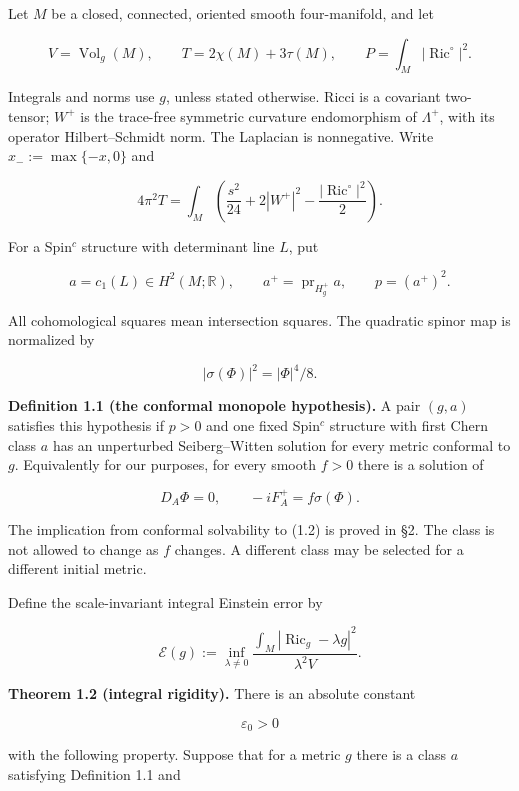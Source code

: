 \documentclass[
  11pt,
]{article}
\begin{document}
Let \(M\) be a closed, connected, oriented smooth four-manifold, and let

\[
 V=\operatorname{Vol}_g(M),\qquad T=2\chi(M)+3\tau(M),\qquad
 P=\int_M|\operatorname{Ric}^{\circ}|^2.
\]

Integrals and norms use \(g\), unless stated otherwise. Ricci is a
covariant two-tensor; \(W^+\) is the trace-free symmetric curvature
endomorphism of \(\Lambda^+\), with its operator Hilbert--Schmidt norm.
The Laplacian is nonnegative. Write \(x_-:=\max\{-x,0\}\) and

\[
 4\pi^2T=\int_M\left(\frac{s^2}{24}+2|W^+|^2
                          -\frac{|\operatorname{Ric}^{\circ}|^2}{2}\right).
 \tag{1.1}
\]

For a Spin\(^c\) structure with determinant line \(L\), put

\[
 a=c_1(L)\in H^2(M;\mathbb R),\qquad
 a^+=\operatorname{pr}_{H_g^+}a,\qquad p=(a^+)^2.
\]

All cohomological squares mean intersection squares. The quadratic
spinor map is normalized by

\[
 |\sigma(\Phi)|^2=|\Phi|^4/8.
\]

\textbf{Definition 1.1 (the conformal monopole hypothesis).} A pair
\((g,a)\) satisfies this hypothesis if \(p>0\) and one fixed Spin\(^c\)
structure with first Chern class \(a\) has an unperturbed
Seiberg--Witten solution for every metric conformal to \(g\).
Equivalently for our purposes, for every smooth \(f>0\) there is a
solution of

\[
 D_A\Phi=0,\qquad -iF_A^+=f\sigma(\Phi).                 \tag{1.2}
\]

The implication from conformal solvability to (1.2) is proved in §2. The
class is not allowed to change as \(f\) changes. A different class may
be selected for a different initial metric.

Define the scale-invariant integral Einstein error by

\[
 \mathcal E(g):=\inf_{\lambda\ne0}
  \frac{\int_M|\operatorname{Ric}_g-\lambda g|^2}
       {\lambda^2V}.                                      \tag{1.3}
\]

\textbf{Theorem 1.2 (integral rigidity).} There is an absolute constant

\[
                       \varepsilon_0>0                   \tag{1.4}
\]

with the following property. Suppose that for a metric \(g\) there is a
class \(a\) satisfying Definition 1.1 and
\end{document}
